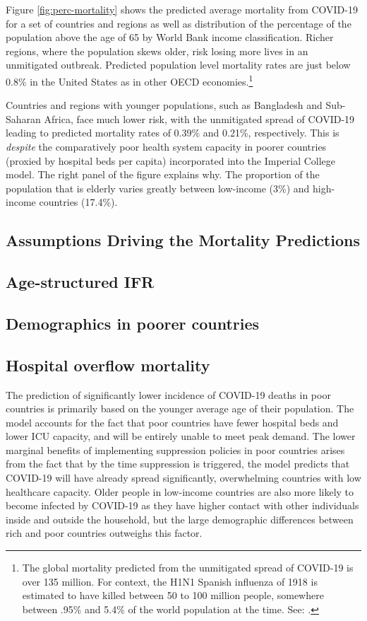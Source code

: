 \documentclass[11pt]{article}
\begin{document}
 
Figure \ref{fig:perc-mortality} shows the predicted average mortality from COVID-19 for a set of countries and regions as well as distribution of the percentage of the population above the age of 65 by World Bank income classification. Richer regions, where the population skews older, risk losing more lives in an unmitigated outbreak. Predicted population level mortality rates are just below 0.8\% in the United States as in other OECD economies.\footnote{
    The global mortality predicted from the unmitigated spread of COVID-19 is over 135 million. For context, the H1N1 Spanish influenza of 1918 is estimated to have killed between 50 to 100 million people, somewhere between .95\% and 5.4\% of the world population at the time. See: \textcite{johnson2002,taubenberger2006}.}


Countries and regions with younger populations, such as Bangladesh and Sub-Saharan Africa, face much lower risk, with the unmitigated spread of COVID-19 leading to predicted mortality rates of 0.39\% and 0.21\%, respectively. This is \emph{despite} the comparatively poor health system capacity in poorer countries (proxied by hospital beds per capita) incorporated into the Imperial College model. The right panel of the figure explains why. The proportion of the population that is elderly varies greatly between low-income (3\%) and high-income countries (17.4\%).

\subsection{Assumptions Driving the Mortality Predictions}

\subsection{Age-structured IFR}

\subsection{Demographics in poorer countries}

\subsection{Hospital overflow mortality}





The prediction of significantly lower incidence of COVID-19 deaths in poor countries is primarily based on the younger average age of their population. The model accounts for the fact that poor countries have fewer hospital beds and lower ICU capacity, and will be entirely unable to meet peak demand. The lower marginal benefits of implementing suppression policies in poor countries arises from the fact that by the time suppression is triggered, the model predicts that COVID-19 will have already spread significantly, overwhelming countries with low healthcare capacity. Older people in low-income countries are also more likely to become infected by COVID-19 as they have higher contact with other individuals inside and outside the household, but the large demographic differences between rich and poor countries outweighs this factor.
\end{document}
